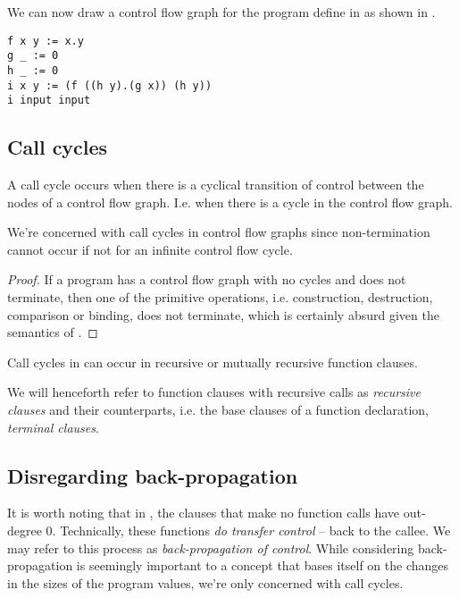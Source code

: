 We can now draw a control flow graph for the program define in
 as shown in .

\begin{lstlisting}[label=listing:cfg-sample-1,caption={A sample \D{} program, always returning \mono{0.0.0}.}]
f x y := x.y
g _ := 0
h _ := 0
i x y := (f ((h y).(g x)) (h y))
i input input
\end{lstlisting}



\subsection{Call cycles}

A call cycle occurs when there is a cyclical transition of control between the
nodes of a control flow graph. I.e. when there is a cycle in the control flow
graph.

\begin{lemma} We're concerned with call cycles in control flow graphs since
non-termination cannot occur if not for an infinite control flow cycle.
\end{lemma}

\begin{proof} If a program has a control flow graph with no cycles and does not
terminate, then one of the primitive operations, i.e. construction,
destruction, comparison or binding, does not terminate, which is certainly
absurd given the semantics of \D{}. \end{proof}

Call cycles in \D{} can occur in recursive or mutually recursive function
clauses.

We will henceforth refer to function clauses with recursive calls as
\emph{recursive clauses} and their counterparts, i.e. the base clauses of a
function declaration, \emph{terminal clauses}.

\subsection{Disregarding back-propagation}

It is worth noting that in , the clauses that make
no function calls have out-degree $0$. Technically, these functions \emph{do
transfer control} -- back to the callee. We may refer to this process as
\emph{back-propagation of control}. While considering back-propagation is
seemingly important to a concept that bases itself on the changes in the sizes
of the program values, we're only concerned with call cycles.

